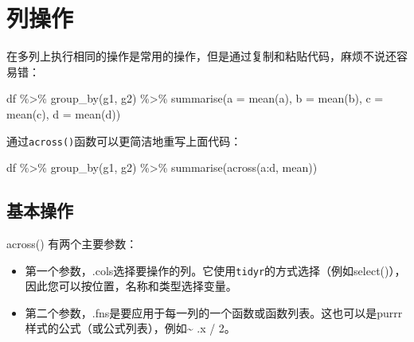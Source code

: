 \documentclass[
]{book}
\newenvironment{Shaded}{\begin{snugshade}}{\end{snugshade}}
\newcommand{\AttributeTok}[1]{\textcolor[rgb]{0.77,0.63,0.00}{#1}}
\newcommand{\FunctionTok}[1]{\textcolor[rgb]{0.00,0.00,0.00}{#1}}
\newcommand{\NormalTok}[1]{#1}
\newcommand{\SpecialCharTok}[1]{\textcolor[rgb]{0.00,0.00,0.00}{#1}}
\begin{document}
\hypertarget{dplyr-column-manipulation}{%
\section{列操作}\label{dplyr-column-manipulation}}

在多列上执行相同的操作是常用的操作，但是通过复制和粘贴代码，麻烦不说还容易错：

\begin{Shaded}
\begin{Highlighting}[]
\NormalTok{df }\SpecialCharTok{\%\textgreater{}\%} 
  \FunctionTok{group\_by}\NormalTok{(g1, g2) }\SpecialCharTok{\%\textgreater{}\%} 
  \FunctionTok{summarise}\NormalTok{(}\AttributeTok{a =} \FunctionTok{mean}\NormalTok{(a), }\AttributeTok{b =} \FunctionTok{mean}\NormalTok{(b), }\AttributeTok{c =} \FunctionTok{mean}\NormalTok{(c), }\AttributeTok{d =} \FunctionTok{mean}\NormalTok{(d))}
\end{Highlighting}
\end{Shaded}

通过\texttt{across()}函数可以更简洁地重写上面代码：

\begin{Shaded}
\begin{Highlighting}[]
\NormalTok{df }\SpecialCharTok{\%\textgreater{}\%} 
  \FunctionTok{group\_by}\NormalTok{(g1, g2) }\SpecialCharTok{\%\textgreater{}\%} 
  \FunctionTok{summarise}\NormalTok{(}\FunctionTok{across}\NormalTok{(a}\SpecialCharTok{:}\NormalTok{d, mean))}
\end{Highlighting}
\end{Shaded}

\hypertarget{ux57faux672cux64cdux4f5c}{%
\subsection{基本操作}\label{ux57faux672cux64cdux4f5c}}

across() 有两个主要参数：

\begin{itemize}
\item
  第一个参数，.cols选择要操作的列。它使用\texttt{tidyr}的方式选择（例如select()），因此您可以按位置，名称和类型选择变量。
\item
  第二个参数，.fns是要应用于每一列的一个函数或函数列表。这也可以是purrr样式的公式（或公式列表），例如\textasciitilde{} .x / 2。
\end{itemize}
\end{document}
